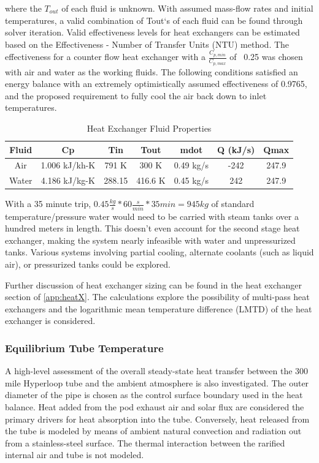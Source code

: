 \documentclass[heading.tex]{subfiles}
\begin{document}
where the $T_{out}$  of each fluid is unknown. With assumed mass-flow rates and initial temperatures, a valid combination of Tout‘s of
each fluid can be found through solver iteration. Valid effectiveness levels for heat exchangers can be estimated based on the
Effectiveness - Number of Transfer Units (NTU) method. 
The effectiveness for a counter flow heat exchanger with a $\frac{C_{p,min}}{C_{p,max}}$ of ~0.25 was chosen with air and water as the working fluids. 
The following conditions satisfied an energy balance with an extremely optimistically assumed effectiveness of 0.9765,
and the proposed requirement to fully cool the air back down to inlet temperatures.


\begin{table} [H]
\centering
\begin{tabular}{|c|c|c|c|c|c|c|}
\hline 
Fluid & Cp & Tin & Tout & mdot & Q (kJ/s) & Qmax \\ 
\hline 
Air & 1.006 kJ/kh-K & 791 K & 300 K & 0.49 kg/s & -242 & 247.9 \\ 
\hline 
Water & 4.186 kJ/kg-K & 288.15 & 416.6 K  & 0.45 kg/s & 242 & 247.9 \\ 
\hline 
\end{tabular} 
 \caption{Heat Exchanger Fluid Properties}
\end{table}

With a 35 minute trip, $0.45 \frac{kg}{s} * 60 \frac{s}{min} * 35min = 945 kg$ of standard temperature/pressure water would need to be carried 
with steam tanks over a hundred meters in length. This doesn't even account for the second stage heat exchanger, making the system nearly infeasible
with water and unpressurized tanks. Various systems involving partial cooling, alternate coolants (such as liquid air), or pressurized tanks could be explored.

Further discussion of heat exchanger sizing can be found in the heat exchanger section of \cref{app:heatX}.
The calculations explore the possibility of multi-pass heat exchangers
and the logarithmic mean temperature difference (LMTD) of the heat exchanger is considered.
\cite{Cengal}
\cite{Turns}


\subsubsection{Equilibrium Tube Temperature}
A high-level assessment of the overall steady-state heat transfer between the 300 mile Hyperloop tube and the ambient atmosphere is
also investigated. The outer diameter of the pipe is chosen as the control surface boundary used in the heat balance. Heat added from the pod exhaust
air and solar flux are considered the primary drivers for heat absorption into the tube. Conversely, heat released from the tube is modeled by means of
ambient natural convection and radiation out from a stainless-steel surface. The thermal interaction between the rarified internal air and
tube is not modeled.
\end{document}

